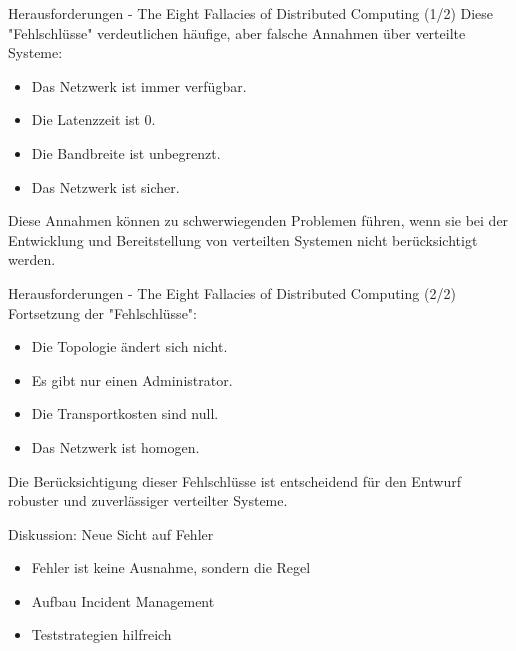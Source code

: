 \documentclass{beamer}
\begin{document}
\begin{frame}{Herausforderungen - The Eight Fallacies of Distributed Computing (1/2)}
  Diese "Fehlschlüsse" verdeutlichen häufige, aber falsche Annahmen über verteilte Systeme:
  \begin{itemize}
    \item Das Netzwerk ist immer verfügbar.
    \item Die Latenzzeit ist 0.
    \item Die Bandbreite ist unbegrenzt.
    \item Das Netzwerk ist sicher.
  \end{itemize}
  Diese Annahmen können zu schwerwiegenden Problemen führen, wenn sie bei der Entwicklung und Bereitstellung von verteilten Systemen nicht berücksichtigt werden.
\end{frame}


\begin{frame}{Herausforderungen - The Eight Fallacies of Distributed Computing (2/2)}
  Fortsetzung der "Fehlschlüsse":
  \begin{itemize}
    \item Die Topologie ändert sich nicht.
    \item Es gibt nur einen Administrator.
    \item Die Transportkosten sind null.
    \item Das Netzwerk ist homogen.
  \end{itemize}
  Die Berücksichtigung dieser Fehlschlüsse ist entscheidend für den Entwurf robuster und zuverlässiger verteilter Systeme.
\end{frame}

\begin{frame}{Diskussion: Neue Sicht auf Fehler}

  \begin{itemize}
    \item Fehler ist keine Ausnahme, sondern die Regel
    \item Aufbau Incident Management
    \item Teststrategien hilfreich 
  \end{itemize}
\end{frame}
\end{document}
